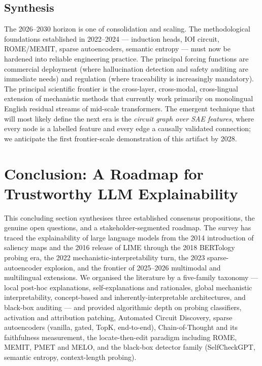 \documentclass{article}
\begin{document}
\subsection{Synthesis}\label{synthesis}

The 2026--2030 horizon is one of consolidation and scaling. The methodological foundations established in 2022--2024 --- induction heads, IOI circuit, ROME/MEMIT, sparse autoencoders, semantic entropy --- must now be hardened into reliable engineering practice. The principal forcing functions are commercial deployment (where hallucination detection and safety auditing are immediate needs) and regulation (where traceability is increasingly mandatory). The principal scientific frontier is the cross-layer, cross-modal, cross-lingual extension of mechanistic methods that currently work primarily on monolingual English residual streams of mid-scale transformers. The emergent technique that will most likely define the next era is the \emph{circuit graph over SAE features}, where every node is a labelled feature and every edge a causally validated connection; we anticipate the first frontier-scale demonstration of this artifact by 2028.

\section{Conclusion: A Roadmap for Trustworthy LLM Explainability}\label{conclusion-a-roadmap-for-trustworthy-llm-explainability}

This concluding section synthesises three established consensus propositions, the genuine open questions, and a stakeholder-segmented roadmap. The survey has traced the explainability of large language models from the 2014 introduction of saliency maps and the 2016 release of LIME through the 2018 BERTology probing era, the 2022 mechanistic-interpretability turn, the 2023 sparse-autoencoder explosion, and the frontier of 2025--2026 multimodal and multilingual extensions. We organised the literature by a five-family taxonomy --- local post-hoc explanations, self-explanations and rationales, global mechanistic interpretability, concept-based and inherently-interpretable architectures, and black-box auditing --- and provided algorithmic depth on probing classifiers, activation and attribution patching, Automated Circuit Discovery, sparse autoencoders (vanilla, gated, TopK, end-to-end), Chain-of-Thought and its faithfulness measurement, the locate-then-edit paradigm including ROME, MEMIT, PMET and MELO, and the black-box detector family (SelfCheckGPT, semantic entropy, context-length probing).
\end{document}
